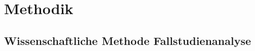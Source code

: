 \chapter{Methodik}
\section{Wissenschaftliche Methode Fallstudienanalyse}


\newcommand{\lhdr}[2]{\parbox[c][32mm][c]{#1}{\centering\textbf{#2}}}
\newcommand{\hdr}[1]{\rotatebox{90}{\scriptsize\strut #1}}

\newcommand{\yes}{\textbf{x}}

